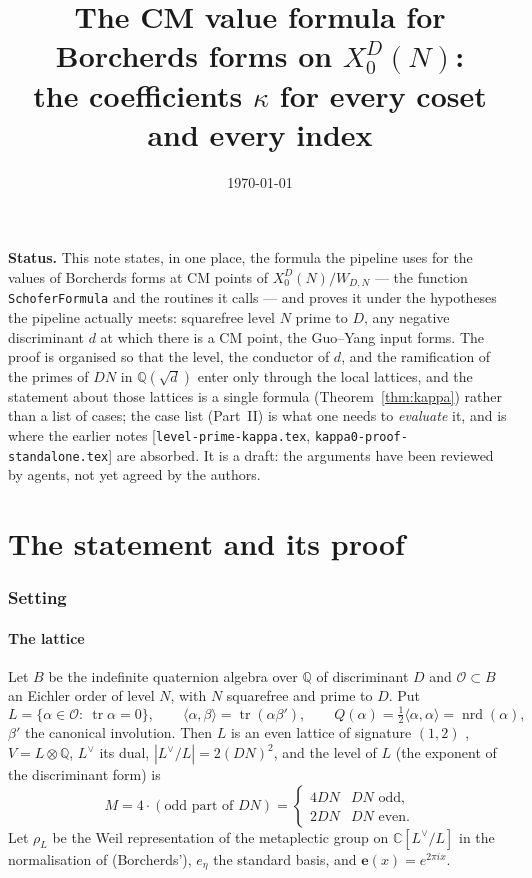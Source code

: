 \documentclass[11pt,reqno]{amsart}
\theoremstyle{plain}
\theoremstyle{definition}
\DeclareMathOperator{\tr}{tr}
\DeclareMathOperator{\nrd}{nrd}
\newcommand{\Q}{\mathbb{Q}}
\newcommand{\C}{\mathbb{C}}
\newcommand{\Ldual}{L^{\vee}}
\newcommand{\e}{\mathbf{e}}
\newcommand{\parentref}[1]{\textup{[#1]}}
\begin{document}
\title[The CM value formula on $X_0^D(N)$]{The CM value formula for Borcherds forms on $X_0^D(N)$: \\ the coefficients $\kappa$ for every coset and every index}
\author{}
\date{\today}
\maketitle

\noindent\textbf{Status.} This note states, in one place, the formula the pipeline uses for the
values of Borcherds forms at CM points of $X_0^D(N)/W_{D,N}$ --- the function
\texttt{SchoferFormula} and the routines it calls --- and proves it under the hypotheses the
pipeline actually meets: squarefree level $N$ prime to $D$, any negative discriminant $d$ at which
there is a CM point, the Guo--Yang input forms. The proof is organised so that the level, the
conductor of $d$, and the ramification of the primes of $DN$ in $\Q(\sqrt d)$ enter only through
the local lattices, and the statement about those lattices is a single formula
(Theorem~\ref{thm:kappa}) rather than a list of cases; the case list (Part~II) is what one needs to
\emph{evaluate} it, and is where the earlier notes
\parentref{\texttt{level-prime-kappa.tex}, \texttt{kappa0-proof-standalone.tex}} are absorbed.
It is a draft: the arguments have been reviewed by agents, not yet agreed by the authors.

\tableofcontents

\part{The statement and its proof}

\section{Setting}\label{sec:setting}

\subsection*{The lattice}
Let $B$ be the indefinite quaternion algebra over $\Q$ of discriminant $D$ and $\mathcal O\subset B$
an Eichler order of level $N$, with $N$ squarefree and prime to $D$. Put
\[
  L=\{\alpha\in\mathcal O:\ \tr\alpha=0\},\qquad \langle\alpha,\beta\rangle=\tr(\alpha\beta'),
  \qquad Q(\alpha)=\tfrac12\langle\alpha,\alpha\rangle=\nrd(\alpha),
\]
$\beta'$ the canonical involution. Then $L$ is an even lattice of signature $(1,2)$
\cite[\S3]{Yang}, $V=L\otimes\Q$, $\Ldual$ its dual, $|\Ldual/L|=2(DN)^2$, and the level of
$L$ (the exponent of the discriminant form) is
\[
  M=4\cdot(\text{odd part of }DN)=\begin{cases}4DN&DN\text{ odd},\\2DN&DN\text{ even}.\end{cases}
\]
Let $\rho_L$ be the Weil representation of the metaplectic group on $\C[\Ldual/L]$ in the
normalisation of \cite[\S3]{Yang} (Borcherds'), $e_\eta$ the standard basis, and $\e(x)=e^{2\pi ix}$.
\end{document}
